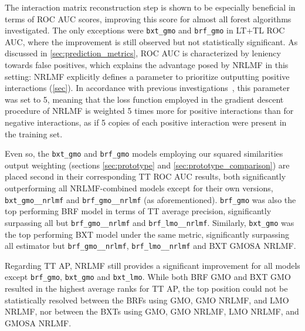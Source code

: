 The interaction matrix reconstruction step is shown to be especially beneficial in terms of ROC AUC scores, improving this score for almost all forest algorithms investigated. The only exceptions were \texttt{bxt\_gmo} and \texttt{brf\_gmo} in LT+TL ROC AUC, where the improvement is still observed but not statistically significant. As discussed in \autoref{sec:prediction_metrics}, ROC AUC is characterized by leniency towards false positives, which explains the advantage posed by NRLMF in this setting: NRLMF explicitly defines a parameter to prioritize outputting positive interactions (\autoref{sec}). %
In accordance with previous investigations~\cite{liu2016neighborhood,liu2017lpinrlmf,liu2020predicting,pliakos2020drugtarget}, this parameter was set to 5, meaning that the loss function employed in the gradient descent procedure of NRLMF is weighted 5 times more for positive interactions than for negative interactions, as if 5 copies of each positive interaction were present in the training set.

Even so, the \texttt{bxt\_gmo} and \texttt{brf\_gmo} models employing our squared similarities output weighting (sections \autoref{sec:prototype} and \autoref{sec:prototype_comparison}) are placed second in their corresponding TT ROC AUC results, both significantly outperforming all NRLMF-combined models except for their own versions, \texttt{bxt\_gmo\_\_nrlmf} and \texttt{brf\_gmo\_\_nrlmf} (as aforementioned).
\texttt{brf\_gmo} was also the top performing BRF model in terms of TT average precision, significantly surpassing all but \texttt{brf\_gmo\_\_nrlmf} and \texttt{brf\_lmo\_\_nrlmf}.
Similarly, \texttt{bxt\_gmo} was the top performing BXT model under the same metric, significantly surpassing all estimator but \texttt{brf\_gmo\_\_nrlmf}, \texttt{brf\_lmo\_\_nrlmf} and BXT GMOSA NRLMF.

Regarding TT AP, NRLMF still provides a significant improvement for all models except \texttt{brf\_gmo}, \texttt{bxt\_gmo} and \texttt{bxt\_lmo}. While both BRF GMO and BXT GMO resulted in the highest average ranks for TT AP, the top position could not be statistically resolved between the BRFs using GMO, GMO NRLMF, and LMO NRLMF, nor between the BXTs using GMO, GMO NRLMF, LMO NRLMF, and GMOSA NRLMF.

